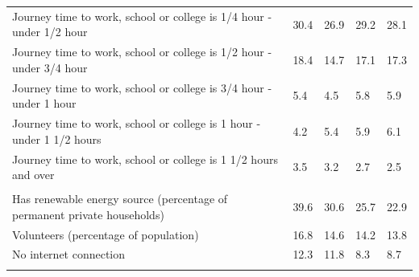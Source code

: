 \documentclass{article}
\begin{document}
\begin{table}[h]
\begin{tabular}{KTTTT}
Journey time to work, school or college is 1/4 hour - under 1/2 hour & 30.4& 26.9& 29.2& 28.1\\
Journey time to work, school or college is 1/2 hour - under 3/4 hour & 18.4& 14.7& 17.1& 17.3\\
Journey time to work, school or college is 3/4 hour - under 1 hour & 5.4& 4.5& 5.8& 5.9\\
Journey time to work, school or college is 1 hour - under 1 1/2 hours & 4.2& 5.4& 5.9& 6.1\\
Journey time to work, school or college is 1 1/2 hours and over & 3.5& 3.2& 2.7& 2.5\\
\hline
    \\ 
    \hline
Has renewable energy source (percentage of permanent private households) & 39.6& 30.6& 25.7& 22.9\\
    \hline
Volunteers (percentage of population) & 16.8& 14.6& 14.2& 13.8\\
    \hline
No internet connection& 12.3& 11.8&  8.3&  8.7\\
\hline
\end{tabular}
\end{table}
\end{document}
